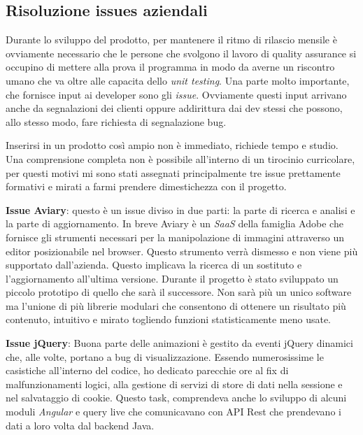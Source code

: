 \documentclass[a4paper]{article}
\begin{document}
\subsection{Risoluzione issues aziendali}
\par Durante lo sviluppo del prodotto, per mantenere il ritmo di rilascio mensile è 
ovviamente necessario che le persone che svolgono il lavoro di quality assurance si occupino 
di mettere alla prova il programma in modo da averne un riscontro umano che va oltre
alle capacita dello \emph{unit testing}. Una parte molto importante, che fornisce input
ai developer sono gli \emph{issue}. Ovviamente questi input arrivano anche da segnalazioni
dei clienti oppure addirittura dai dev stessi che possono, allo stesso modo, fare richiesta
di segnalazione bug.\\
\par Inserirsi in un prodotto così ampio non è immediato, richiede tempo e studio.
Una comprensione completa non è possibile all'interno di un tirocinio curricolare, per
questi motivi mi sono stati assegnati principalmente tre issue prettamente formativi 
e mirati a farmi prendere dimestichezza con il progetto.
\par \textbf{Issue Aviary}: questo è un issue diviso in due parti: la parte di ricerca 
e analisi e la parte di aggiornamento. In breve Aviary è un \emph{SaaS} della famiglia
Adobe che fornisce gli strumenti necessari per la manipolazione di immagini attraverso
un editor posizionabile nel browser. Questo strumento verrà dismesso e non viene più
supportato dall'azienda. Questo implicava la ricerca di un sostituto e l'aggiornamento all'ultima versione.
Durante il progetto è stato sviluppato un piccolo prototipo di quello che sarà il successore.
Non sarà più un unico software ma l'unione di più librerie modulari che consentono di
ottenere un risultato più contenuto, intuitivo e mirato togliendo funzioni statisticamente
meno usate.\\
\par \textbf{Issue jQuery}: Buona parte delle animazioni è gestito da eventi jQuery 
dinamici che, alle volte, portano a bug di visualizzazione. Essendo numerosissime
le casistiche all'interno del codice, ho dedicato parecchie ore al fix di malfunzionamenti
logici, alla gestione di servizi di store di dati nella sessione e nel salvataggio di cookie.
Questo task, comprendeva anche lo sviluppo di alcuni moduli \emph{Angular} e query live
che comunicavano con API Rest che prendevano i dati a loro volta dal backend Java.\\
\end{document}
